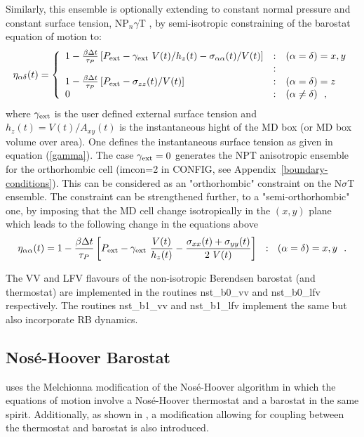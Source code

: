 Similarly, this ensemble is optionally extending to constant
normal pressure and constant surface tension, NP$_{n}\gamma$T
\cite{ikeguchi-04a}, by semi-isotropic constraining of the
barostat equation of motion to:
\begin{equation}
\eta_{\alpha\delta}(t) = \left\{ \begin{array} {l@{\quad:\quad}l}
1 - {\beta \Delta t \over \tau_{P}} \left[ P_{\rm ext} - \gamma_{\rm ext}~V(t) / h_{z}(t) -
\sigma_{\alpha\alpha}(t) / V(t) \right] & (\alpha = \delta) = x,y \\
& \\
1 - {\beta \Delta t \over \tau_{P}} \left[ P_{\rm ext} -
\sigma_{zz}(t) / V(t) \right] & (\alpha = \delta) = z \\
0 & (\alpha \ne \delta)~~,
\end{array} \right.
\end{equation}
where $\gamma_{\rm ext}$ is the user defined external surface tension
and $h_{z}(t) = V(t) / A_{xy}(t)$ is the instantaneous hight of the
MD box (or MD box volume over area).  One defines the instantaneous surface
tension as given in equation (\ref{gamma}).  The case $\gamma_{\rm ext}=0$
generates the NPT anisotropic ensemble for the orthorhombic cell
(imcon=2 in CONFIG, see Appendix~\ref{boundary-conditions}).  This
can be considered as an "orthorhombic" constraint on the N$\sigma$T ensemble.
The constraint can be strengthened further, to a "semi-orthorhombic" one, by
imposing that the MD cell change isotropically in the $(x,y)$ plane
which leads to the following change in the equations above
\begin{equation}
\eta_{\alpha\alpha}(t) = 1 - {\beta \Delta t \over \tau_{P}}
\left[ P_{\rm ext} - \gamma_{\rm ext}~ \frac{V(t)}{h_{z}(t)} -
\frac{\sigma_{xx}(t)+\sigma_{yy}(t)}{2~V(t)} \right]~~:~~(\alpha = \delta) = x,y~~.
\end{equation}

The VV and LFV flavours of the non-isotropic Berendsen barostat (and thermostat)
are implemented in the \D routines {\sc nst\_b0\_vv} and {\sc nst\_b0\_lfv} respectively.
The routines {\sc nst\_b1\_vv} and {\sc nst\_b1\_lfv} implement the
same but also incorporate RB dynamics.

\subsection{Nos\'{e}-Hoover Barostat}

\D uses the Melchionna modification of the Nos\'e-Hoover algorithm
\cite{melchionna-93a} in which the equations of motion involve a
Nos\'e-Hoover thermostat and a
barostat in the same spirit.
Additionally, as shown in \cite{martyna-94a}, a modification
allowing for coupling between the thermostat and barostat is also
introduced.

